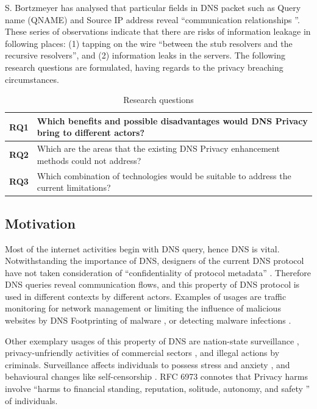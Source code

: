 \documentclass[a4paper,12pt]{article}
\begin{document}
S. Bortzmeyer has analysed that particular fields in DNS packet \cite{rfc1035} such as Query name (QNAME) and Source IP address reveal ``communication relationships \cite{rfc7626}''.
These series of observations indicate that there are risks of information leakage in following places: (1) tapping on the wire ``between the stub resolvers and the recursive resolvers'', and (2) information leaks in the servers.
The following research questions are formulated, having regards to the privacy breaching circumstances.

\begin{table}[h!]
    \begin{tabular} {|p{1.2cm}|p{12.8cm}|} \hline
        \textbf{RQ1} & Which benefits and possible disadvantages would DNS Privacy bring to different actors? \\ \hline
        \textbf{RQ2} & Which are the areas that the existing DNS Privacy enhancement methods could not address? \\ \hline
        \textbf{RQ3} & Which combination of technologies would be suitable to address the current limitations?\\ \hline
    \end{tabular}
    \caption{Research questions}
\label{researchquestions}
\end{table}

\subsection{Motivation}
Most of the internet activities begin with DNS query, hence DNS is vital. Notwithstanding the importance of DNS, designers of the current DNS protocol have not taken consideration of ``confidentiality of protocol metadata'' \cite{wachs2014censorship}.
Therefore DNS queries reveal communication flows, and this property of DNS protocol is used in different contexts by different actors. Examples of usages are traffic monitoring for network management or limiting the influence of malicious websites by DNS Footprinting of malware \cite{stoner2010dns}, or detecting malware infections \cite{lemos2013got}.

Other exemplary usages of this property of DNS are nation-state surveillance \cite{NSA-SIGINT}, privacy-unfriendly activities of commercial sectors \cite{weaver2011redirecting}, and illegal actions by criminals. Surveillance affects individuals to possess stress and anxiety \cite{oulasvirta2012long}, and behavioural changes like self-censorship \cite{rfc6973}. RFC 6973 connotes that Privacy harms involve ``harms to financial standing, reputation, solitude, autonomy, and safety \cite{rfc6973}'' of individuals.
\end{document}
